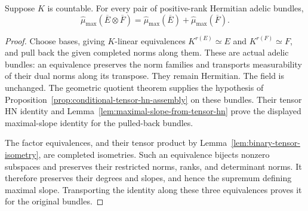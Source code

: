\begin{lemma}
\label{lem:binary-bost-identity}
\leanok
Suppose $K$ is countable. For every pair of positive-rank Hermitian
adelic bundles,
\[
 \widehat\mu_{\max}(\overline E\otimes\overline F)
 =\widehat\mu_{\max}(\overline E)+\widehat\mu_{\max}(\overline F).
\]
\end{lemma}
\begin{proof}
Choose bases, giving $K$-linear equivalences $K^{r(E)}\simeq E$ and
$K^{r(F)}\simeq F$, and pull back the given completed norms along them.
These are actual adelic bundles: an equivalence preserves the norm
families and transports measurability of their dual norms along its
transpose. They remain Hermitian. The field is unchanged.
The geometric quotient theorem supplies the hypothesis of
Proposition~\ref{prop:conditional-tensor-hn-assembly} on these bundles.
Their tensor HN identity and
Lemma~\ref{lem:maximal-slope-from-tensor-hn} prove the displayed
maximal-slope identity for the pulled-back bundles.

The factor equivalences, and their tensor product by
Lemma~\ref{lem:binary-tensor-isometry}, are completed isometries.
Such an equivalence bijects nonzero subspaces and preserves their
restricted norms, ranks, and determinant norms. It therefore preserves
their degrees and slopes, and hence the supremum defining maximal slope.
Transporting the identity along these three equivalences proves it for
the original bundles.
\end{proof}

